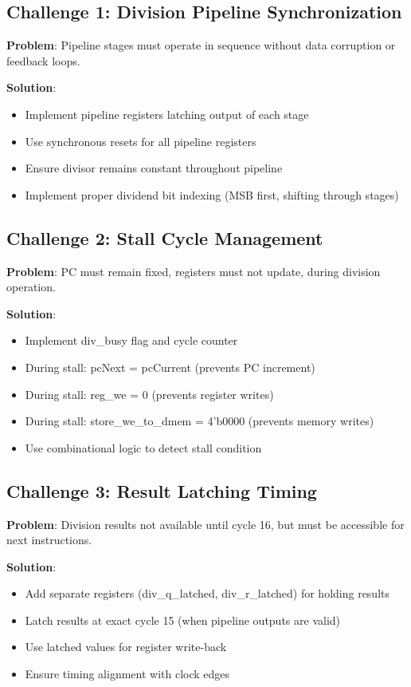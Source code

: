 \documentclass[a4paper, 11pt]{article}
\begin{document}
\subsection{Challenge 1: Division Pipeline Synchronization}

\textbf{Problem}: Pipeline stages must operate in sequence without data corruption or feedback loops.

\textbf{Solution}:
\begin{itemize}
    \item Implement pipeline registers latching output of each stage
    \item Use synchronous resets for all pipeline registers
    \item Ensure divisor remains constant throughout pipeline
    \item Implement proper dividend bit indexing (MSB first, shifting through stages)
\end{itemize}

\subsection{Challenge 2: Stall Cycle Management}

\textbf{Problem}: PC must remain fixed, registers must not update, during division operation.

\textbf{Solution}:
\begin{itemize}
    \item Implement div\_busy flag and cycle counter
    \item During stall: pcNext = pcCurrent (prevents PC increment)
    \item During stall: reg\_we = 0 (prevents register writes)
    \item During stall: store\_we\_to\_dmem = 4'b0000 (prevents memory writes)
    \item Use combinational logic to detect stall condition
\end{itemize}

\subsection{Challenge 3: Result Latching Timing}

\textbf{Problem}: Division results not available until cycle 16, but must be accessible for next instructions.

\textbf{Solution}:
\begin{itemize}
    \item Add separate registers (div\_q\_latched, div\_r\_latched) for holding results
    \item Latch results at exact cycle 15 (when pipeline outputs are valid)
    \item Use latched values for register write-back
    \item Ensure timing alignment with clock edges
\end{itemize}
\end{document}
